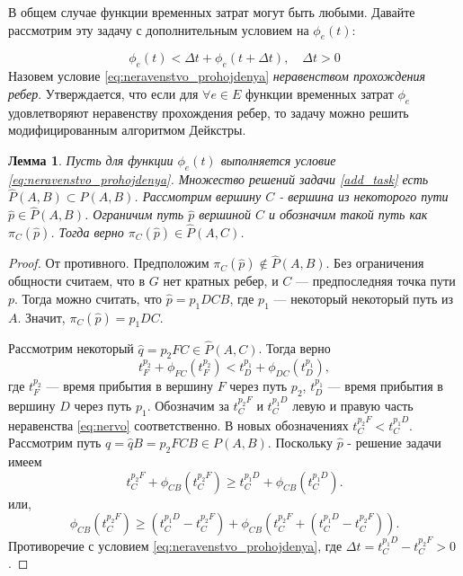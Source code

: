 \documentclass[12pt, a4paper]{article}
\newtheorem{lemma}{Лемма}[section]
\begin{document}
	В общем случае функции временных затрат могут быть любыми. Давайте рассмотрим эту задачу с дополнительным условием на $\phi_e(t):$
	
	\begin{equation}
		\label{eq:neravenstvo_prohojdenya}
		\phi_e(t) <\Delta t + \phi_e(t + \Delta t), \quad \Delta t > 0
	\end{equation}
	Назовем условие \ref{eq:neravenstvo_prohojdenya} \textit{неравенством прохождения ребер}. Утверждается, что если для $\forall e \in E$ функции временных затрат $\phi_e$ удовлетворяют неравенству прохождения ребер, то задачу можно решить модифицированным алгоритмом Дейкстры.
	
		\begin{lemma}
		\label{lemma:uslovie}
		Пусть для функции $\phi_e(t)$ выполняется условие \eqref{eq:neravenstvo_prohojdenya}. Множество решений задачи \eqref{add_task} есть $\widehat{P} (A, B) \subset P (A, B)$. Рассмотрим вершину $C$ - вершина из некоторого пути $\widehat{p} \in \widehat{P} (A, B)$. Ограничим  путь $\widehat{p}$ вершиной $C$ и обозначим такой путь как  $\pi_C(\widehat{p})$. Тогда верно $\pi_C(\widehat{p}) \in \widehat{P} (A, C)$.  
	\end{lemma}
	
	\begin{proof}
		От противного. Предположим $\pi_C(\widehat{p}) \notin \widehat{P} (A, B)$. Без ограничения общности считаем, что в $G$ нет кратных ребер, и $C$ --- предпоследняя точка пути $p$. Тогда можно считать, что $\widehat{p} = p_1DCB$, где $p_1$ --- некоторый некоторый путь из $A$. Значит, $\pi_C(\widehat{p}) = p_1DC$. 
		
		Рассмотрим некоторый $\widehat{q} = p_2FC \in \widehat{P} (A, C)$. Тогда верно
		\begin{equation}
			\label{eq:nervo}
			t_F^{p_2} + \phi_{FC}(t_F^{p_2}) < t_D^{p_1} + \phi_{DC}(t_D^{p_1}),
		\end{equation}
		где $t_F^{p_2}$ --- время прибытия в вершину $F$ через путь $p_2$, $t_D^{p_1}$ --- время прибытия в  вершину $D$ через путь $p_1$. Обозначим за $t_{C}^{p_2F}$ и $t_{C}^{p_1D}$ левую и правую часть неравенства \eqref{eq:nervo} соответственно. В новых обозначениях $t_{C}^{p_2F} < t_{C}^{p_1D}$.
		Рассмотрим путь $q = \widehat{q}B =  p_2FCB \in P (A, B)$. Поскольку $\widehat{p}$ - решение задачи имеем 
		\begin{equation*}
			\label{eq:nervo_reshenie1}
			t_{C}^{p_2F} + \phi_{CB}(t_{C}^{p_2F}) \ge t_{C}^{p_1D} + \phi_{CB}(t_{C}^{p_1D}).
		\end{equation*}
		или, 
		\begin{equation}
			\label{eq:nervo_reshenie2}
			\phi_{CB}\left(t_{C}^{p_2F}\right) \ge \left(t_{C}^{p_1D} - t_{C}^{p_2F}\right) + \phi_{CB}\left(t_{C}^{p_2F} + \left(t_{C}^{p_1D} - t_{C}^{p_2F}\right)\right).
		\end{equation}
		Противоречие с условием \eqref{eq:neravenstvo_prohojdenya}, где $\Delta t = t_{C}^{p_1D} - t_{C}^{p_2F} > 0$.
	\end{proof}
	
\end{document}
